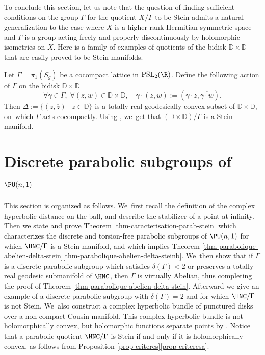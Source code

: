 To conclude this section, let us note that the question of finding sufficient conditions on the group $\Gamma$ for the quotient $X/\Gamma$ to be Stein admits a natural generalization to the case where $X$ is a higher rank Hermitian symmetric space and $\Gamma$ is a group acting freely and properly discontinuously by holomorphic isometries on $X$. Here is a family of examples of quotients of the bidisk $\mathbb{D}\times \mathbb{D}$ that are easily proved to be Stein manifolds.

\begin{example}
Let $\Gamma=\pi_1(S_g)$ be a cocompact lattice in $\mathrm{PSL}_2(\R)$. Define the following action of $\Gamma$ on the bidisk $\mathbb{D}\times \mathbb{D}$
\begin{equation*}
\forall \gamma \in \Gamma,\; \forall (z,w)\in \mathbb{D}\times \mathbb{D},\quad \gamma\cdot (z,w):= (\gamma \cdot z,\overline{\gamma \cdot \overline{w}}).
\end{equation*}
Then $\Delta:= \{(z,\overline{z}) \mid z\in \mathbb{D}\}$ is a totally real geodesically convex subset of $\mathbb{D}\times \mathbb{D}$, on~which $\Gamma$ acts cocompactly. Using \cite[Prop.\,3.2]{chenDiscreteGroupsHolomorphic2013}, we~get that $(\mathbb{D}\times \mathbb{D})/\Gamma$ is a Stein manifold.
\end{example}

\section{Discrete parabolic subgroups of \texorpdfstring{$\PU(n,1)$}{PU}}\label{section-paraboliques}

This section is organized as follows. We~first recall the definition of the complex hyperbolic distance on the ball, and describe the stabilizer of a point at infinity. Then we state and prove Theorem \ref{thm-caracterisation-parab-stein} which characterizes the discrete and torsion-free parabolic subgroups of $\PU(n,1)$ for which $\HNC/\Gamma$ is a Stein manifold, and which implies Theorem \ref{thm-parabolique-abelien-delta-stein}\eqref{thm-parabolique-abelien-delta-steinb}. We~then show that if $\Gamma$ is a discrete parabolic subgroup which satisfies $\delta(\Gamma)<2$ or preserves a totally real geodesic submanifold of $\HNC$, then $\Gamma$ is virtually Abelian, thus completing the proof of Theorem \ref{thm-parabolique-abelien-delta-stein}. Afterward we give an example of a discrete parabolic subgroup with $\delta(\Gamma)=2$ and for which $\HNC/\Gamma$ is not Stein. We~also construct a complex hyperbolic bundle of punctured disks over a non-compact Cousin manifold. This complex hyperbolic bundle is not holomorphically convex, but holomorphic functions separate points by \cite[Th.\,1.1]{miebachQuotientsBoundedHomogeneous2024}. Notice that a parabolic quotient $\HNC/\Gamma$ is Stein if and only if it is holomorphically convex, as follows from Proposition \ref{prop-criteres}\eqref{prop-criteresa}.

